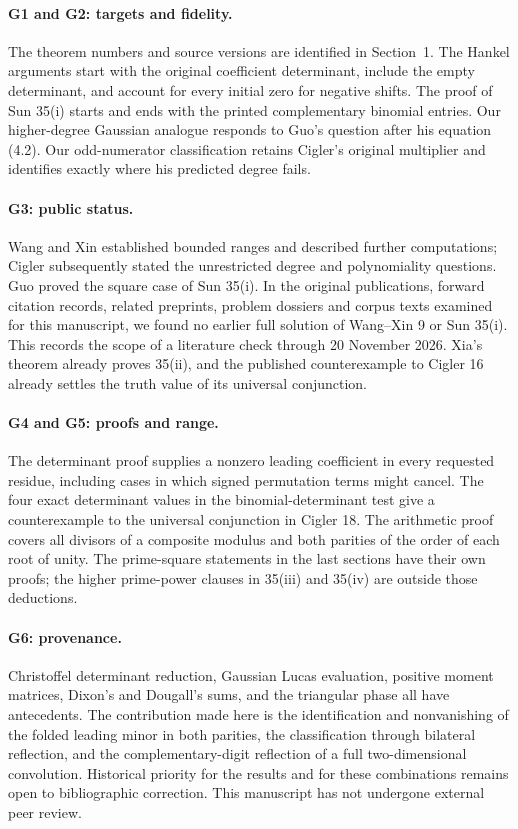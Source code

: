 \documentclass[11pt,a4paper]{article}
\theoremstyle{definition}\newtheorem{problem}[theorem]{Auxiliary problem}
\theoremstyle{remark}\newtheorem*{remark}{Remark}
\begin{document}
\paragraph{G1 and G2: targets and fidelity.}
The theorem numbers and source versions are identified in Section~1. The Hankel arguments start with the original coefficient determinant, include the empty determinant, and account for every initial zero for negative shifts. The proof of Sun 35(i) starts and ends with the printed complementary binomial entries. Our higher-degree Gaussian analogue responds to Guo's question after his equation (4.2). Our odd-numerator classification retains Cigler's original multiplier and identifies exactly where his predicted degree fails.

\paragraph{G3: public status.}
Wang and Xin established bounded ranges and described further computations; Cigler subsequently stated the unrestricted degree and polynomiality questions. Guo proved the square case of Sun 35(i). In the original publications, forward citation records, related preprints, problem dossiers and corpus texts examined for this manuscript, we found no earlier full solution of Wang--Xin 9 or Sun 35(i). This records the scope of a literature check through 20 November 2026. Xia's theorem already proves 35(ii), and the published counterexample to Cigler 16 already settles the truth value of its universal conjunction.

\paragraph{G4 and G5: proofs and range.}
The determinant proof supplies a nonzero leading coefficient in every requested residue, including cases in which signed permutation terms might cancel. The four exact determinant values in the binomial-determinant test give a counterexample to the universal conjunction in Cigler 18. The arithmetic proof covers all divisors of a composite modulus and both parities of the order of each root of unity. The prime-square statements in the last sections have their own proofs; the higher prime-power clauses in 35(iii) and 35(iv) are outside those deductions.

\paragraph{G6: provenance.}
Christoffel determinant reduction, Gaussian Lucas evaluation, positive moment matrices, Dixon's and Dougall's sums, and the triangular phase all have antecedents. The contribution made here is the identification and nonvanishing of the folded leading minor in both parities, the classification through bilateral reflection, and the complementary-digit reflection of a full two-dimensional convolution. Historical priority for the results and for these combinations remains open to bibliographic correction. This manuscript has not undergone external peer review.
\end{document}
